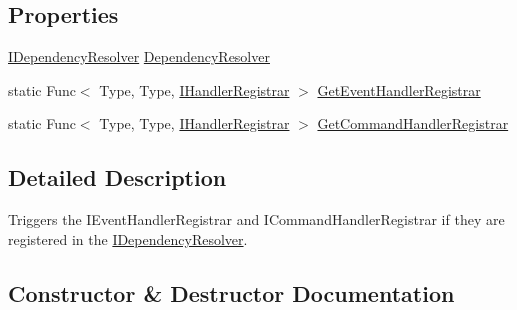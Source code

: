 \subsection*{Properties}
\begin{DoxyCompactItemize}
\item 
\hyperlink{interfaceCqrs_1_1Configuration_1_1IDependencyResolver}{I\+Dependency\+Resolver} \hyperlink{classCqrs_1_1Configuration_1_1BusRegistrar_aafccd565c2d9a748ff0f850a94100399_aafccd565c2d9a748ff0f850a94100399}{Dependency\+Resolver}
\item 
static Func$<$ Type, Type, \hyperlink{interfaceCqrs_1_1Bus_1_1IHandlerRegistrar}{I\+Handler\+Registrar} $>$ \hyperlink{classCqrs_1_1Configuration_1_1BusRegistrar_adaab0236b3ce39214ce60b2272e5ab19_adaab0236b3ce39214ce60b2272e5ab19}{Get\+Event\+Handler\+Registrar}
\item 
static Func$<$ Type, Type, \hyperlink{interfaceCqrs_1_1Bus_1_1IHandlerRegistrar}{I\+Handler\+Registrar} $>$ \hyperlink{classCqrs_1_1Configuration_1_1BusRegistrar_a5ac56d73af9d550c70ee722daed7dce8_a5ac56d73af9d550c70ee722daed7dce8}{Get\+Command\+Handler\+Registrar}
\end{DoxyCompactItemize}


\subsection{Detailed Description}
Triggers the I\+Event\+Handler\+Registrar and I\+Command\+Handler\+Registrar if they are registered in the \hyperlink{interfaceCqrs_1_1Configuration_1_1IDependencyResolver}{I\+Dependency\+Resolver}. 



\subsection{Constructor \& Destructor Documentation}
\mbox{\label{classCqrs_1_1Configuration_1_1BusRegistrar_a4a934d21a535b28af6c67154512bba20_a4a934d21a535b28af6c67154512bba20}} 
